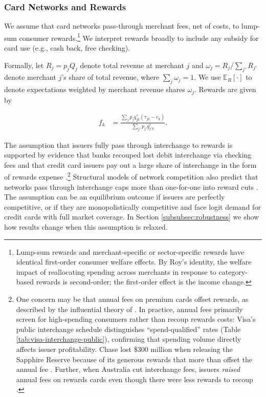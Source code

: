 \documentclass[main.tex]{subfiles}
\begin{document}
\subsubsection{Card Networks and Rewards}
We assume that card networks pass-through merchant fees, net of costs, to lump-sum consumer rewards.\footnote{ Lump-sum rewards and merchant-specific or sector-specific rewards have identical first-order consumer welfare effects.
By Roy's identity, the welfare impact of reallocating spending across merchants in response to category-based rewards is second-order; the first-order effect is the income change. } 
We interpret rewards broadly to include any subsidy for card use (e.g., cash back, free checking).

Formally, let $R_j=p_jQ_j$ denote total revenue at merchant $j$ and $\omega_j = R_j / \sum_{j'} R_{j'}$ denote merchant $j$'s share of total revenue, where $\sum_j \omega_j = 1$.
We use $\mathbb{E}_R[\cdot]$ to denote expectations weighted by merchant revenue shares $\omega_j$.
Rewards are given by

\begin{align*}
f_{k} & =\frac{\sum_{j}p_{j}q_{jk}^{*}\left(\tau_{jk}-c_{k}\right)}{\sum_{j'}p_{j'}q_{j'k}^{*}}.
\end{align*}

The assumption that issuers fully pass through interchange to rewards is supported by evidence that banks recouped lost debit interchange via checking fees \citep{Kay.etal2018,Mukharlyamov.Sarin2025} and that credit card issuers pay out a large share of interchange in the form of rewards expense \citep{Drechsler.etal2025,Adams.Bord2020}.\footnote{One concern may be that annual fees on premium cards offset rewards, as described by the influential theory of \citet{Bedre-Defolie.Calvano2013}.
In practice, annual fees primarily screen for high-spending consumers rather than recoup rewards costs: Visa's public interchange schedule distinguishes ``spend-qualified'' rates (Table \ref{tab:visa-interchange-public}), confirming that spending volume directly affects issuer profitability.
Chase lost \$300 million when releasing the Sapphire Reserve because of its generous rewards that more than offset the annual fee \citep{Son2018}.
Further, when Australia cut interchange fees, issuers \textit{raised} annual fees on rewards cards even though there were less rewards to recoup \citep{RBA2006}.}
Structural models of network competition also predict that networks pass through interchange caps more than one-for-one into reward cuts \citep{Wang2025}.
The assumption can be an equilibrium outcome if issuers are perfectly competitive, or if they are monopolistically competitive and face logit demand for credit cards with full market coverage.
In Section \ref{subsubsec:robustness} we show how results change when this assumption is relaxed.
\end{document}
